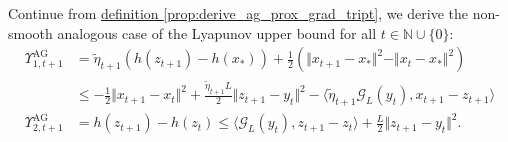     \begin{lemma}
    \label{lemma:nsmooth_agg_lyapunov_upper_bound}
        Continue from 
        \hyperref[prop:derive_ag_prox_grad_tript]
        {definition \ref*{prop:derive_ag_prox_grad_tript}},
        we derive the non-smooth analogous case of the Lyapunov upper bound for all $t \in \mathbb N \cup \{0\}$: 
        \begin{align*}
            \Upsilon_{1, t + 1}^\text{AG}
            &= 
            \tilde\eta_{t + 1} (h(z_{t + 1}) - h(x_*)) + 
            \frac{1}{2} (
                \Vert x_{t + 1} - x_*\Vert^2
                - 
                \Vert x_t - x_*\Vert^2
            )
            \\
            &\le 
            - \frac{1}{2}\Vert x_{t + 1} - x_t\Vert^2 
            + \frac{\tilde\eta_{t + 1}L}{2}\Vert z_{t + 1} - y_t\Vert^2
            - \langle 
                \tilde\eta_{t + 1} \mathcal G_L(y_t), 
                x_{t + 1} - z_{t + 1}
            \rangle
            \\
            \Upsilon_{2, t + 1}^\text{AG}
            &= 
            h(z_{t + 1}) - h(z_t) 
            \le 
            \langle \mathcal G_L(y_t), z_{t + 1} - z_t\rangle + 
            \frac{L}{2}\Vert z_{t + 1} - y_t\Vert^2. 
        \end{align*}
    \end{lemma}
